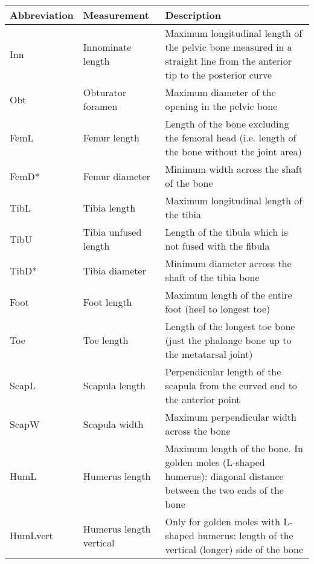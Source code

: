 

\begin{longtable}{p{2.4cm}p{3.2cm}p{9.5cm}}
\hline
\textbf{Abbreviation} & \textbf{Measurement} & \textbf{Description}\\
\hline



Inn & Innominate length & Maximum longitudinal length of the pelvic bone measured in a straight line from the anterior tip to the posterior curve \\ 
Obt & Obturator foramen & Maximum diameter of the opening in the pelvic bone \\
FemL & Femur length & Length of the bone excluding the femoral head (i.e. length of the bone without the joint area)  \\
FemD* & Femur diameter & Minimum width across the shaft of the bone \\
TibL & Tibia length & Maximum longitudinal length of the tibia  \\
TibU & Tibia unfused length & Length of the tibula which is not fused with the fibula \\
TibD* & Tibia diameter & Minimum diameter across the shaft of the tibia bone \\
Foot & Foot length & Maximum length of the entire foot (heel to longest toe) \\
Toe & Toe length & Length of the longest toe bone (just the phalange bone up to the metatarsal joint) \\
ScapL & Scapula length & Perpendicular length of the scapula from the curved end to the anterior point  \\
ScapW & Scapula width & Maximum perpendicular width across the bone \\
HumL & Humerus length & Maximum length of the bone. In golden moles (L-shaped humerus): diagonal distance between the two ends of the bone  \\
HumLvert & Humerus length vertical & Only for golden moles with L-shaped humerus: length of the vertical (longer) side of the bone \\

\end{longtable}
